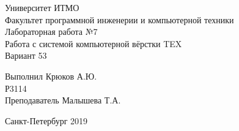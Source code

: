 \begin{center}
\large{Университет ИТМО}\\ 
\large{Факультет программной инженерии и компьютерной техники}\\
\vspace{5cm}
\large{Лабораторная работа №7}\\
\large{Работа с системой
компьютерной вёрстки TEX\\
Вариант 53}\\
\end{center}
\vspace{5cm}
\normalsize{
\begin{flushright}
 Выполнил Крюков А.Ю.\\
 Р3114\\
 Преподаватель Малышева Т.А. 
\end{flushright}
}
\null\vfill
\begin{center} Санкт-Петербург 2019 \end{center}
\thispagestyle{empty} 
